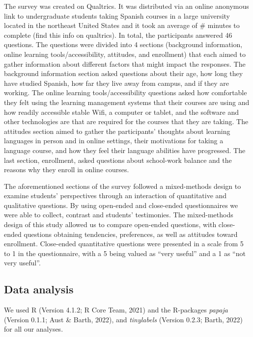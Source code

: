 \documentclass[
  man]{apa6}
\begin{document}
The survey was created on Qualtrics.
It was distributed via an online anonymous link to undergraduate students taking Spanish courses in a large university located in the northeast United States and it took an average of \# minutes to complete (find this info on qualtrics).
In total, the participants answered 46 questions.
The questions were divided into 4 sections (background information, online learning tools/accessibility, attitudes, and enrollment) that each aimed to gather information about different factors that might impact the responses.
The background information section asked questions about their age, how long they have studied Spanish, how far they live away from campus, and if they are working.
The online learning tools/accessibility questions asked how comfortable they felt using the learning management systems that their courses are using and how readily accessible stable Wifi, a computer or tablet, and the software and other technologies are that are required for the courses that they are taking.
The attitudes section aimed to gather the participants' thoughts about learning languages in person and in online settings, their motivations for taking a language course, and how they feel their language abilities have progressed.
The last section, enrollment, asked questions about school-work balance and the reasons why they enroll in online courses.

The aforementioned sections of the survey followed a mixed-methods design to examine students' perspectives through an interaction of quantitative and qualitative questions.
By using open-ended and close-ended questionnaires we were able to collect, contrast and students' testimonies.
The mixed-methods design of this study allowed us to compare open-ended questions, with close-ended questions obtaining tendencies, preferences, as well as attitudes toward enrollment.
Close-ended quantitative questions were presented in a scale from 5 to 1 in the questionnaire, with a 5 being valued as ``very useful'' and a 1 as ``not very useful''.

\hypertarget{data-analysis}{%
\subsection{Data analysis}\label{data-analysis}}

We used R (Version 4.1.2; R Core Team, 2021) and the R-packages \emph{papaja} (Version 0.1.1; Aust \& Barth, 2022), and \emph{tinylabels} (Version 0.2.3; Barth, 2022) for all our analyses.
\end{document}
